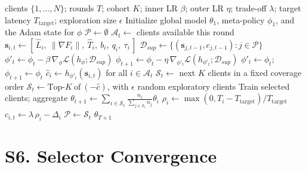\documentclass[10pt]{article}
\begin{document}
\begin{algorithm}[!ht]
\caption{MAML-Select (extended)}
\label{alg:ext}
\begin{algorithmic}[1]
\footnotesize
\Require clients $\{1,\dots,N\}$; rounds $T$; cohort $K$; inner LR $\beta$; outer LR $\eta$; trade-off $\lambda$; target latency $T_{\mathrm{target}}$; exploration size $\epsilon$
\State Initialize global model $\theta_1$, meta-policy $\phi_1$, and the Adam state for $\phi$
\State $\mathcal{P}\gets\emptyset$ 
  \State $\mathcal{A}_t\gets$ clients available this round
   
     \State $\bm{s}_{i,t}\gets[\,\hat{L}_i,\ \lVert\nabla F_i\rVert,\ \hat{T}_i,\ b_i,\ q_i,\ \tau_i\,]$ 
  \EndFor
   
     \State $\mathcal{D}_{sup}\gets\{(\bm{s}_{j,t-1},c_{j,t-1}):j\in\mathcal{P}\}$
     \State $\phi'_t\gets\phi_t-\beta\,\nabla_\phi\mathcal{L}(h_\phi;\mathcal{D}_{sup})$ 
     \State $\phi_{t+1}\gets\phi_t-\eta\,\nabla_{\phi'_t}\mathcal{L}(h_{\phi'_t};\mathcal{D}_{sup})$ 
  \Else
     \State $\phi'_t\gets\phi_t$;\quad $\phi_{t+1}\gets\phi_t$
  \EndIf
  \State $\widehat{c}_i\gets h_{\phi'_t}(\bm{s}_{i,t})$ for all $i\in\mathcal{A}_t$ 
     \State $\mathcal{S}_t\gets$ next $K$ clients in a fixed coverage order 
  \Else
     \State $\mathcal{S}_t\gets\mathrm{Top\text{-}}K\ \mathrm{of}\ (-\widehat{c})$, with $\epsilon$ random exploratory clients
  \EndIf
  \State Train selected clients; aggregate $\theta_{t+1}\gets\sum_{i\in\mathcal{S}_t}\tfrac{n_i}{\sum_{j\in\mathcal{S}_t}n_j}\theta_i$ 
   
     \State $\rho_i\gets\max(0,T_i-T_{\mathrm{target}})/T_{\mathrm{target}}$ 
     \State $c_{i,t}\gets\lambda\,\rho_i-\Delta_i$ 
  \EndFor
  \State $\mathcal{P}\gets\mathcal{S}_t$
\EndFor
\State \Return $\theta_{T+1}$
\end{algorithmic}
\end{algorithm}

\section*{S6. Selector Convergence}
\end{document}

